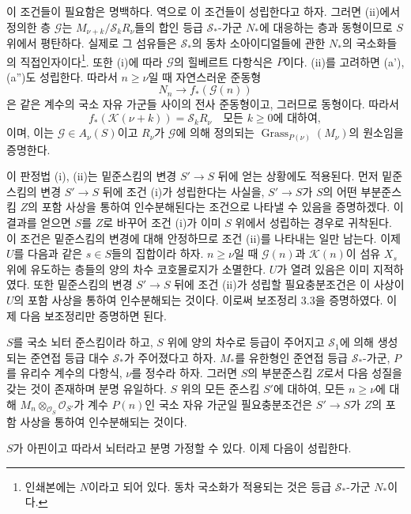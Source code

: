 이 조건들이 필요함은 명백하다. 역으로 이 조건들이 성립한다고 하자.
그러면 (ii)에서 정의한 층 $\mathcal G$는
$M_{\nu+k}/\mathcal S_kR_\nu$들의 합인 등급 $\mathcal S_*$-가군
$N_*$에 대응하는 층과 동형이므로 $S$ 위에서 평탄하다. 실제로 그
섬유들은 $\mathcal S_*$의 동차 소아이디얼들에 관한 $N_*$의 국소화들의
직접인자이다\footnote{인쇄본에는 $N$이라고 되어
있다. 동차 국소화가 적용되는 것은 등급 $\mathcal S_*$-가군 $N_*$이다.}.
또한 (i)에 따라 $\mathcal G$의 힐베르트 다항식은 $P$이다. (ii)를
고려하면 (a'), (a'')도 성립한다. 따라서 $n\geq\nu$일 때 자연스러운
준동형
\[
N_n\longrightarrow f_*(\mathcal G(n))
\]
은 같은 계수의 국소 자유 가군들 사이의 전사 준동형이고, 그러므로
동형이다. 따라서
\[
f_*(\mathcal K(\nu+k))=\mathcal S_kR_\nu
\quad\text{모든 $k\geq0$에 대하여},
\]
이며, 이는 $\mathcal G\in A_\nu(S)$이고 $R_\nu$가 $\mathcal G$에 의해
정의되는 $\operatorname{Grass}_{P(\nu)}(M_\nu)$의 원소임을 증명한다.

이 판정법 (i), (ii)는 밑준스킴의 변경 $S'\longrightarrow S$ 뒤에 얻는
상황에도 적용된다. 먼저 밑준스킴의 변경 $S'\longrightarrow S$ 뒤에
조건 (i)가 성립한다는 사실을, $S'\longrightarrow S$가 $S$의 어떤
부분준스킴 $Z$의 포함 사상을 통하여 인수분해된다는 조건으로 나타낼 수
있음을 증명하겠다. 이 결과를 얻으면 $S$를 $Z$로 바꾸어 조건 (i)가 이미
$S$ 위에서 성립하는 경우로 귀착된다. 이 조건은 밑준스킴의 변경에 대해
안정하므로 조건 (ii)를 나타내는 일만 남는다. 이제 $U$를 다음과 같은
$s\in S$들의 집합이라 하자. $n\geq\nu$일 때 $\mathcal G(n)$과
$\mathcal K(n)$이 섬유 $X_s$ 위에 유도하는 층들의 양의 차수 코호몰로지가
소멸한다. $U$가 열려 있음은 이미 지적하였다. 또한 밑준스킴의 변경
$S'\longrightarrow S$ 뒤에 조건 (ii)가 성립할 필요충분조건은 이 사상이
$U$의 포함 사상을 통하여 인수분해되는 것이다. 이로써 보조정리 3.3을
증명하였다. 이제 다음 보조정리만 증명하면 된다.

 $S$를 국소 뇌터 준스킴이라 하고, $S$ 위에 양의
차수로 등급이 주어지고 $\mathcal S_1$에 의해 생성되는 준연접 등급 대수
$\mathcal S_*$가 주어졌다고 하자. $M_*$를 유한형인 준연접 등급
$\mathcal S_*$-가군, $P$를 유리수 계수의 다항식, $\nu$를 정수라 하자.
그러면 $S$의 부분준스킴 $Z$로서 다음 성질을 갖는 것이 존재하며 분명
유일하다.
$S$ 위의 모든 준스킴 $S'$에 대하여, 모든 $n\geq\nu$에 대해
$M_n\otimes_{\mathcal O_S}\mathcal O_{S'}$가 계수 $P(n)$인 국소 자유
가군일 필요충분조건은 $S'\longrightarrow S$가 $Z$의 포함 사상을 통하여
인수분해되는 것이다.

$S$가 아핀이고 따라서 뇌터라고 분명 가정할 수 있다. 이제 다음이
성립한다.

